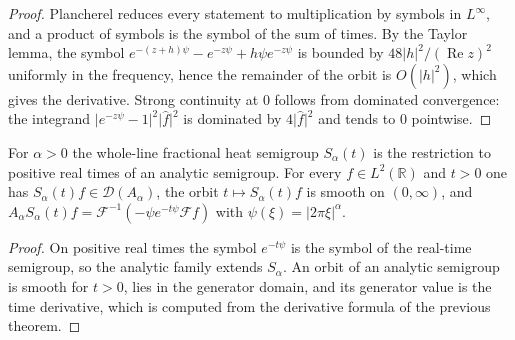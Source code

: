 \begin{proof}
\leanok
Plancherel reduces every statement to multiplication by symbols in $L^\infty$, and a product of symbols is the symbol of the sum of times. By the Taylor lemma, the symbol $e^{-(z+h)\psi} - e^{-z\psi} + h\psi e^{-z\psi}$ is bounded by $48\lvert h \rvert^2 / (\operatorname{Re} z)^2$ uniformly in the frequency, hence the remainder of the orbit is $O(\lvert h \rvert^2)$, which gives the derivative. Strong continuity at $0$ follows from dominated convergence: the integrand $\lvert e^{-z\psi} - 1 \rvert^2 \lvert \hat f \rvert^2$ is dominated by $4\lvert \hat f \rvert^2$ and tends to $0$ pointwise.
\end{proof}

\begin{theorem}\label{thm:s_analytic_frac}
\leanok
For $\alpha > 0$ the whole-line fractional heat semigroup $S_\alpha(t)$ is the restriction to positive real times of an analytic semigroup. For every $f \in L^2(\mathbb{R})$ and $t > 0$ one has $S_\alpha(t) f \in \mathcal{D}(A_\alpha)$, the orbit $t \mapsto S_\alpha(t) f$ is smooth on $(0, \infty)$, and $A_\alpha S_\alpha(t) f = \mathcal{F}^{-1}(-\psi e^{-t\psi} \mathcal{F} f)$ with $\psi(\xi) = \lvert 2\pi\xi \rvert^\alpha$.
\end{theorem}

\begin{proof}
\leanok
On positive real times the symbol $e^{-t\psi}$ is the symbol of the real-time semigroup, so the analytic family extends $S_\alpha$. An orbit of an analytic semigroup is smooth for $t > 0$, lies in the generator domain, and its generator value is the time derivative, which is computed from the derivative formula of the previous theorem.
\end{proof}
